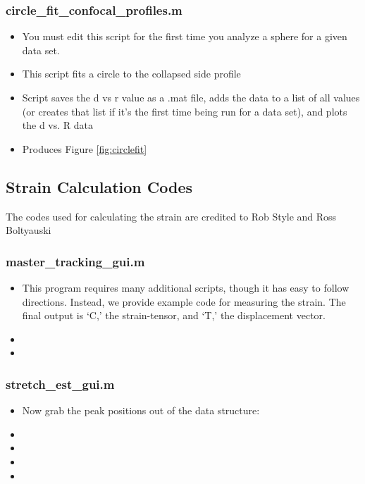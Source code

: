 \subsubsection*{circle\_fit\_confocal\_profiles.m}
\begin{itemize}
	\item You must edit this script for the first time you analyze a sphere for a given data set.
	\item This script fits a circle to the collapsed side profile
	\item Script saves the d vs r value as a .mat file, adds the \code{[d,R]} data to a list of all \code{[d,R]} values (or creates that list if it's the first time being run for a data set), and plots the d vs. R data
	\item Produces Figure \ref{fig:circlefit}
\end{itemize}

\subsection{Strain Calculation Codes}
The codes used for calculating the strain are credited to Rob Style and Ross Boltyauski
\subsubsection*{master\_tracking\_gui.m}
\begin{itemize}
	\item This program requires many additional scripts, though it has easy to follow directions. Instead, we provide example code for measuring the strain. The final output is `C,' the strain-tensor, and `T,' the displacement vector.
	\item {}
	\item {}
\end{itemize}
\subsubsection*{stretch\_est\_gui.m}
\begin{itemize}
	
	\item Now grab the peak positions out of the data structure:
	\item {}
	\item {}
	\item {}
	\item {}
	
\end{itemize}

